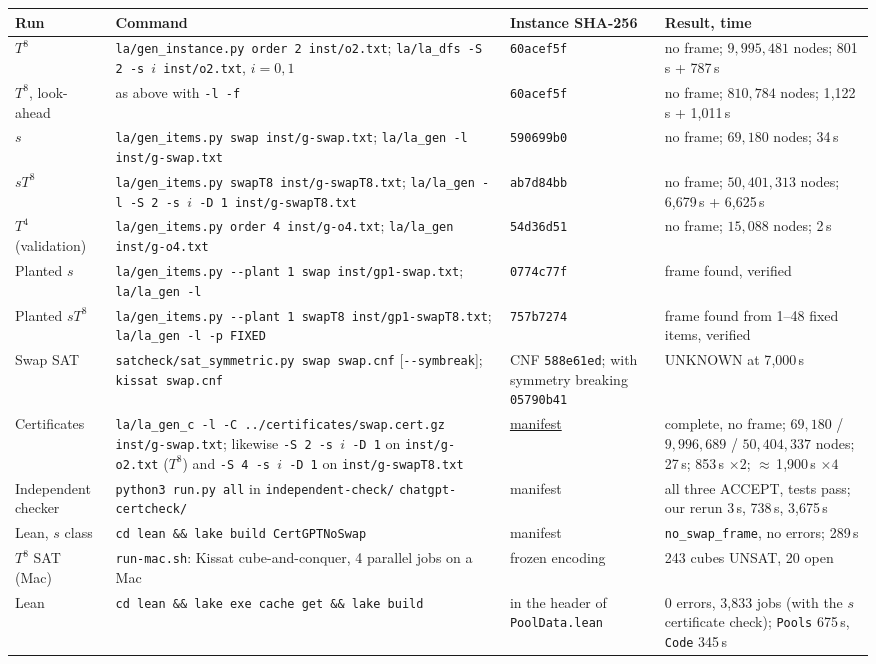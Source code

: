 \documentclass[11pt]{article}
\theoremstyle{definition}
\theoremstyle{remark}
\newcommand{\repourl}{https://github.com/alectionary/vibe-math}
\newcommand{\rdir}{formalization/canonical-width/c16/restricted-frames-20261031}
\newcommand{\ours}[2]{\href{\repourl/blob/master/\rdir/#1}{#2}}
\begin{document}
{\small
\begin{longtable}{@{}p{2.2cm}p{7.3cm}p{1.9cm}p{3.6cm}@{}}
\toprule
Run & Command & Instance SHA-256 & Result, time \\
\midrule\endhead
$T^8$ & \texttt{la/gen\_instance.py order 2 inst/o2.txt}; \texttt{la/la\_dfs -S 2 -s $i$ inst/o2.txt}, $i=0,1$ & \texttt{60acef5f} & no frame; $9{,}995{,}481$ nodes; 801\,s + 787\,s \\
$T^8$, look-ahead & as above with \texttt{-l -f} & \texttt{60acef5f} & no frame; $810{,}784$ nodes; 1{,}122\,s + 1{,}011\,s \\
$s$ & \texttt{la/gen\_items.py swap inst/g-swap.txt}; \texttt{la/la\_gen -l inst/g-swap.txt} & \texttt{590699b0} & no frame; $69{,}180$ nodes; 34\,s \\
$sT^8$ & \texttt{la/gen\_items.py swapT8 inst/g-swapT8.txt}; \texttt{la/la\_gen -l -S 2 -s $i$ -D 1 inst/g-swapT8.txt} & \texttt{ab7d84bb} & no frame; $50{,}401{,}313$ nodes; 6{,}679\,s + 6{,}625\,s \\
$T^4$ (validation) & \texttt{la/gen\_items.py order 4 inst/g-o4.txt}; \texttt{la/la\_gen inst/g-o4.txt} & \texttt{54d36d51} & no frame; $15{,}088$ nodes; 2\,s \\
Planted $s$ & \texttt{la/gen\_items.py -{}-plant 1 swap inst/gp1-swap.txt}; \texttt{la/la\_gen -l} & \texttt{0774c77f} & frame found, verified \\
Planted $sT^8$ & \texttt{la/gen\_items.py -{}-plant 1 swapT8 inst/gp1-swapT8.txt}; \texttt{la/la\_gen -l -p FIXED} & \texttt{757b7274} & frame found from 1--48 fixed items, verified \\
Swap SAT & \texttt{satcheck/sat\_symmetric.py swap swap.cnf} [\texttt{-{}-symbreak}]; \texttt{kissat swap.cnf} & CNF \texttt{588e61ed}; with symmetry breaking \texttt{05790b41} & UNKNOWN at 7{,}000\,s \\
Certificates & \texttt{la/la\_gen\_c -l -C ../certificates/swap.cert.gz inst/g-swap.txt}; likewise \texttt{-S 2 -s $i$ -D 1} on \texttt{inst/g-o2.txt} ($T^8$) and \texttt{-S 4 -s $i$ -D 1} on \texttt{inst/g-swapT8.txt} & \ours{certificates/MANIFEST.json}{manifest} & complete, no frame; $69{,}180$ / $9{,}996{,}689$ / $50{,}404{,}337$ nodes; 27\,s; 853\,s $\times2$; $\approx$\,1{,}900\,s $\times4$ \\
Independent checker & \texttt{python3 run.py all} in \texttt{independent-check/} \texttt{chatgpt-certcheck/} & manifest & all three ACCEPT, tests pass; our rerun 3\,s, 738\,s, 3{,}675\,s \\
Lean, $s$ class & \texttt{cd lean \&\& lake build CertGPTNoSwap} & manifest & \texttt{no\_swap\_frame}, no errors; 289\,s \\
$T^8$ SAT (Mac) & \texttt{run-mac.sh}: Kissat cube-and-conquer, 4 parallel jobs on a Mac & frozen encoding & 243 cubes UNSAT, 20 open \\
Lean & \texttt{cd lean \&\& lake exe cache get \&\& lake build} & in the header of \texttt{PoolData\-.lean} & 0 errors, 3{,}833 jobs (with the $s$ certificate check); \texttt{Pools} 675\,s, \texttt{Code} 345\,s \\
\bottomrule
\end{longtable}}
\end{document}
